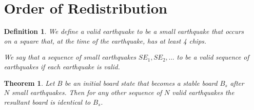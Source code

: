 \documentclass[11pt]{article}
\newtheorem{theorem}{Theorem}
\newtheorem{definition}{Definition}
\begin{document}
\section{Order of Redistribution}
\begin{definition}
We define a valid earthquake to be a small earthquake that occurs on a square that, at the time of the earthquake, has at least 4 chips.

We say that a sequence of small earthquakes $SE_1, SE_2, \ldots$ to be a valid sequence of earthquakes if each earthquake is valid.
\end{definition}

\begin{theorem}
Let $B$ be an initial board state that becomes a stable board $B_s$ after $N$ small earthquakes. Then for any other sequence of $N$ valid earthquakes the resultant board is identical to $B_s$.
\end{theorem}
\end{document}
